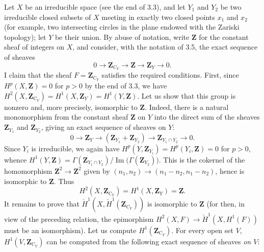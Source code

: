 

Let $X$ be an irreducible space (see the end of 3.3), and let $Y_1$ and $Y_2$
be two irreducible closed subsets of $X$ meeting in exactly two closed points $x_1$
and $x_2$ (for example, two intersecting circles in the plane endowed with the
Zariski topology); let $Y$ be their union. By abuse of notation, write
$\mathbf Z$ for the constant sheaf of integers on $X$, and consider, with the
notation of 3.5, the exact sequence of sheaves
\[
0\to\mathbf Z_{\mathrm C_Y}\to\mathbf Z
\to\mathbf Z_Y\to 0.
\]
I claim that the sheaf $F=\mathbf Z_{\mathrm C_Y}$ satisfies the required conditions.
First, since $H^p(X,\mathbf Z)=0$ for $p>0$ by the end of 3.3, we have
$H^2(X,\mathbf Z_{\mathrm C_Y})=H^1(X,\mathbf Z_Y)=H^1(Y,\mathbf Z)$. Let us show
that this group is nonzero and, more precisely, isomorphic to $\mathbf Z$.
Indeed, there is a natural monomorphism from the constant sheaf $\mathbf Z$ on
$Y$ into the direct sum of the sheaves $\mathbf Z_{Y_1}$ and
$\mathbf Z_{Y_2}$, giving an exact sequence of sheaves on $Y$:
\[
0\to\mathbf Z_Y
\to(\mathbf Z_{Y_1}+\mathbf Z_{Y_2})
\to\mathbf Z_{Y_1\cap Y_2}\to 0.
\]
Since $Y_i$ is irreducible, we again have
$H^p(Y,\mathbf Z_{Y_i})=H^p(Y_i,\mathbf Z)=0$ for $p>0$, whence
$H^1(Y,\mathbf Z)
=\Gamma(\mathbf Z_{Y_1\cap Y_2})/
\operatorname{Im}\bigl(\Gamma(\mathbf Z_{Y_2})\bigr)$.
This is the cokernel of the homomorphism
$\mathbf Z^2\to\mathbf Z^2$ given by
$(n_1,n_2)\to(n_1-n_2,n_1-n_2)$, hence is isomorphic to $\mathbf Z$.
Thus
\[
H^2(X,\mathbf Z_{\mathrm C_Y})=H^1(X,\mathbf Z_Y)=\mathbf Z.
\]
It remains to prove that $\check H^1(X,\check H^1(\mathbf Z_{\mathrm C_Y}))$ is isomorphic to
$\mathbf Z$ (for then, in view of the preceding relation, the epimorphism
$H^2(X,F)\to\check H^1(X,H^1(F))$ must be an isomorphism). Let us
compute $H^1(\mathbf Z_{\mathrm C_Y})$. For every open set $V$,
$H^1(V,\mathbf Z_{\mathrm C_Y})$ can be computed from the following exact sequence of
sheaves \emph{on $V$}:
